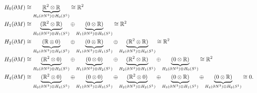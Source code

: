 \documentclass{article}
\begin{document}
\begin{align*}
    H_0(\partial M) &\cong \underbrace{\mathbb{R}^2 \otimes \mathbb{R}}_{H_0(\partial N^3)\otimes H_0(S^1)} \cong \mathbb{R}^2 \\
    H_1(\partial M) &\cong \underbrace{(\mathbb{R}^2 \otimes \mathbb{R})}_{H_0(\partial N^3)\otimes H_1(S^1)} \oplus \underbrace{(0 \otimes \mathbb{R})}_{H_1(\partial N^3)\otimes H_0(S^1)} \cong \mathbb{R}^2 \\
    H_2(\partial M) &\cong \underbrace{(\mathbb{R} \otimes 0)}_{H_0(\partial N^3)\otimes H_2(S^1)} \oplus \underbrace{(0 \otimes \mathbb{R})}_{H_1(\partial N^3)\otimes H_1(S^1)} \oplus \underbrace{(\mathbb{R}^2 \otimes \mathbb{R})}_{H_2(\partial N^3)\otimes H_0(S^1)} \cong \mathbb{R}^2\\
    H_3(\partial M) &\cong \underbrace{(\mathbb{R}^2 \otimes 0)}_{H_0(\partial N^3)\otimes H_3(S^1)} \oplus \underbrace{(0 \otimes 0)}_{H_1(\partial N^3)\otimes H_2(S^1)} \oplus \underbrace{(\mathbb{R}^2 \otimes \mathbb{R})}_{H_2(\partial N^3)\otimes H_1(S^1)} \oplus \underbrace{(0 \otimes \mathbb{R})}_{H_3(\partial N^3)\otimes H_0(S^1)} \cong \mathbb{R}^2\\
    H_4(\partial M) &\cong \underbrace{(\mathbb{R}^2 \otimes 0)}_{H_0(\partial N^3)\otimes H_4(S^1)} \oplus \underbrace{(0 \otimes 0)}_{H_1(\partial N^3)\otimes H_3(S^1)} \oplus \underbrace{(\mathbb{R}^2 \otimes 0)}_{H_2(\partial N^3)\otimes H_2(S^1)} \oplus \underbrace{(0 \otimes \mathbb{R})}_{H_3(\partial N^3)\otimes H_1(S^1)} \oplus \underbrace{(0 \otimes \mathbb{R})}_{H_4(\partial N^3)\otimes H_0(S^1)} \cong 0.
\end{align*}
\end{document}
